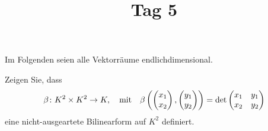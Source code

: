 \documentclass[a4paper, 10pt]{scrartcl}
\title{Tag 5}
\author{}
\date{}
\begin{document}
Im Folgenden seien alle Vektorräume endlichdimensional.










\begin{question}
  Zeigen Sie, dass
  \[
            \beta
    \colon  K^2 \times K^2
    \to     K,
    \quad\text{mit}\quad
      \beta\left( \begin{pmatrix} x_1 \\ x_2 \end{pmatrix}, \begin{pmatrix} y_1 \\ y_2 \end{pmatrix} \right)
    = \det
      \begin{pmatrix}
        x_1 & y_1 \\
        x_2 & y_2
      \end{pmatrix}
  \]
  eine nicht-ausgeartete Bilinearform auf $K^2$ definiert.
\end{question}
\end{document}
